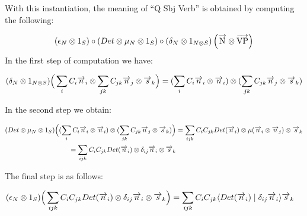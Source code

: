 With this instantiation, the  meaning of ``Q Sbj Verb'' is obtained by computing the following:

\[
(\epsilon_N \otimes 1_S) \circ (Det \otimes  \mu_N \otimes 1_S) \circ (\delta_N \otimes 1_{N \otimes S})\left(\overrightarrow{\text{N}} \otimes \overrightarrow{\text{VP}}\right)
\]
In the first step of computation we have:

\begin{align*}
(\delta_N \otimes 1_{N \otimes S})\Big(\sum_i C_i \overrightarrow{n}_i \otimes \sum_{jk} C_{jk} \overrightarrow{n}_j \otimes \overrightarrow{s}_k\Big) = 
(\sum_i C_i \overrightarrow{n}_i \otimes \overrightarrow{n}_i) \otimes  (\sum_{jk} C_{jk} \overrightarrow{n}_j \otimes \overrightarrow{s}_k)
\end{align*}

\noindent
In the second step we obtain: 

\begin{align*}
(Det \otimes  \mu_N \otimes 1_S)\Big((\sum_i C_i \overrightarrow{n}_i \otimes \overrightarrow{n}_i) \otimes  (\sum_{jk} C_{jk} \overrightarrow{n}_j \otimes \overrightarrow{s}_k)\Big) &= 
\sum_{ijk} C_i C_{jk} Det(\overrightarrow{n}_i) \otimes \mu(\overrightarrow{n}_i \otimes \overrightarrow{n}_j) \otimes \overrightarrow{s}_k \\
= \sum_{ijk} C_i C_{jk} Det(\overrightarrow{n}_i) \otimes \delta_{ij} \overrightarrow{n}_i \otimes \overrightarrow{s}_k&
\end{align*}

\noindent
The final step is as follows:

\begin{align*}
(\epsilon_{N} \otimes 1_S)  \Big(\sum_{ijk} C_i C_{jk} Det(\overrightarrow{n}_i) \otimes \delta_{ij} \overrightarrow{n}_i \otimes \overrightarrow{s}_k \Big) &=   
\sum_{ijk} C_i C_{jk} \langle Det(\overrightarrow{n}_i) \mid \delta_{ij} \overrightarrow{n}_i \rangle \overrightarrow{s}_k
\end{align*}

